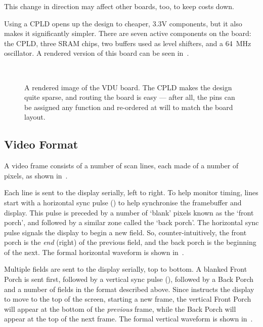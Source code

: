 This change in direction may affect other boards, too, to keep costs down.

Using a CPLD opens up the design to cheaper, 3.3V components, but it
also makes it significantly simpler. There are seven active components
on the board: the CPLD, three SRAM chips, two  buffers used
as level shifters, and a 64~MHz oscillator. A rendered version of this
board can be seen in~.

\begin{figure}
\centering
{}\vspace{1em}\\
\caption{\label{fig:vdu-board}A rendered image of the VDU board. The CPLD makes
  the design quite sparse, and routing the board is easy — after all, the pins
  can be assigned any function and re-ordered at will to match the board
  layout.}
\end{figure}


\subsection{Video Format}

A video frame consists of a number of scan lines, each made of a
number of pixels, as shown in~.

Each line is sent to the display serially, left to right. To help monitor
timing, lines start with a horizontal sync pulse () to help
synchronise the framebuffer and display. This pulse is preceded by a number of
‘blank’ pixels known as the ‘front porch’, and followed by a similar zone
called the ‘back porch’. The horizontal sync pulse signals the display to begin
a new field. So, counter-intuitively, the front porch is the {\em end\/}
(right) of the previous field, and the back porch is the beginning of the
next. The formal horizontal waveform is shown in~.

Multiple fields are sent to the display serially, top to bottom. A blanked Front
Porch is sent first, followed by a vertical sync pulse (), followed
by a Back Porch and a number of fields in the format described above. Since
 instructs the display to move to the top of the screen, starting a
new frame, the vertical Front Porch will appear at the bottom of the {\em
  previous\/} frame, while the Back Porch will appear at the top of the next
frame. The formal vertical waveform is shown in~.

